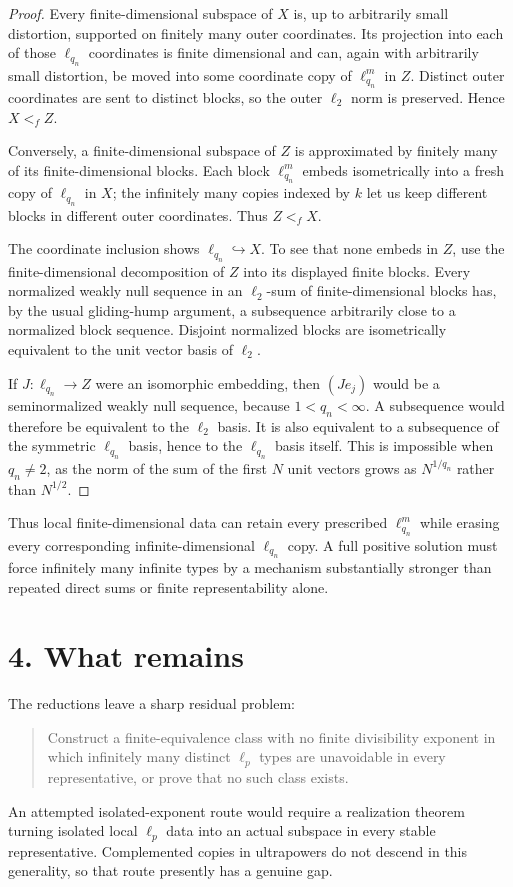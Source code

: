 \documentclass[11pt]{article}
\begin{document}
\begin{proof}
Every finite-dimensional subspace of $X$ is, up to arbitrarily small
distortion, supported on finitely many outer coordinates.  Its projection
into each of those $\ell_{q_n}$ coordinates is finite dimensional and can,
again with arbitrarily small distortion, be moved into some coordinate copy
of $\ell_{q_n}^{m}$ in $Z$.  Distinct outer coordinates are sent to distinct
blocks, so the outer $\ell_2$ norm is preserved.  Hence $X<_f Z$.

Conversely, a finite-dimensional subspace of $Z$ is approximated by finitely
many of its finite-dimensional blocks.  Each block $\ell_{q_n}^{m}$ embeds
isometrically into a fresh copy of $\ell_{q_n}$ in $X$; the infinitely many
copies indexed by $k$ let us keep different blocks in different outer
coordinates.  Thus $Z<_f X$.

The coordinate inclusion shows $\ell_{q_n}\hookrightarrow X$.  To see that
none embeds in $Z$, use the finite-dimensional decomposition of $Z$ into its
displayed finite blocks.  Every normalized weakly null sequence in an
$\ell_2$-sum of finite-dimensional blocks has, by the usual gliding-hump
argument, a subsequence arbitrarily close to a normalized block sequence.
Disjoint normalized blocks are isometrically equivalent to the unit vector
basis of $\ell_2$.

If $J:\ell_{q_n}\to Z$ were an isomorphic embedding, then
$(Je_j)$ would be a seminormalized weakly null sequence, because
$1<q_n<\infty$.  A subsequence would therefore be equivalent to the
$\ell_2$ basis.  It is also equivalent to a subsequence of the symmetric
$\ell_{q_n}$ basis, hence to the $\ell_{q_n}$ basis itself.  This is
impossible when $q_n\ne2$, as the norm of the sum of the first $N$ unit
vectors grows as $N^{1/q_n}$ rather than $N^{1/2}$.
\end{proof}

Thus local finite-dimensional data can retain every prescribed
$\ell_{q_n}^m$ while erasing every corresponding infinite-dimensional
$\ell_{q_n}$ copy.  A full positive solution must force infinitely many
infinite types by a mechanism substantially stronger than repeated direct
sums or finite representability alone.

\section*{4. What remains}

The reductions leave a sharp residual problem:
\begin{quote}
Construct a finite-equivalence class with no finite divisibility exponent in
which infinitely many
distinct $\ell_p$ types are unavoidable in every representative, or prove
that no such class exists.
\end{quote}
An attempted isolated-exponent route would require a realization theorem
turning isolated local $\ell_p$ data into an actual subspace in every stable
representative.  Complemented copies in ultrapowers do not descend in this
generality, so that route presently has a genuine gap.
\end{document}
